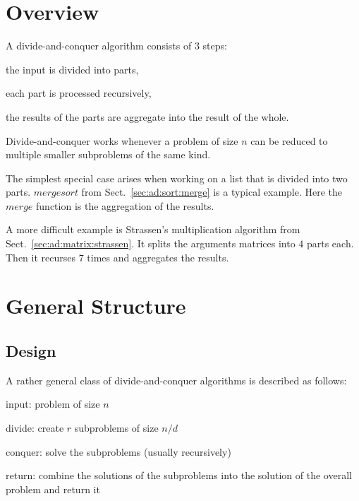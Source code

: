 \section{Overview}

A divide-and-conquer algorithm consists of $3$ steps:
\begin{compactenum}
 \item the input is divided into parts,
 \item each part is processed recursively,
 \item the results of the parts are aggregate into the result of the whole.
\end{compactenum}
Divide-and-conquer works whenever a problem of size $n$ can be reduced to multiple smaller subproblems of the same kind.

The simplest special case arises when working on a list that is divided into two parts.
$mergesort$ from Sect.~\ref{sec:ad:sort:merge} is a typical example.
Here the $merge$ function is the aggregation of the results. 

A more difficult example is Strassen's multiplication algorithm from Sect.~\ref{sec:ad:matrix:strassen}.
It splits the arguments matrices into $4$ parts each.
Then it recurses $7$ times and aggregates the results.

\section{General Structure}

\subsection{Design}

A rather general class of divide-and-conquer algorithms is described as follows:
\begin{compactenum}
 \item input: problem of size $n$
 \item divide: create $r$ subproblems of size $n/d$
 \item conquer: solve the subproblems (usually recursively)
 \item return: combine the solutions of the subproblems into the solution of the overall problem and return it
\end{compactenum}


